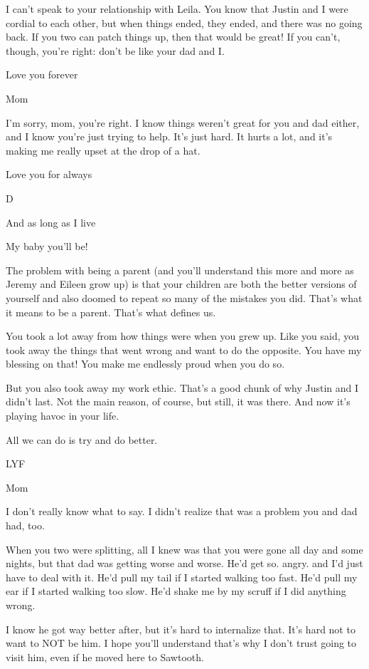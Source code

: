 I can't speak to your relationship with Leila. You know that Justin and I were cordial to each other, but when things ended, they ended, and there was no going back. If you two can patch things up, then that would be great! If you can't, though, you're right: don't be like your dad and I.

Love you forever

Mom

\secdiv{}

I'm sorry, mom, you're right. I know things weren't great for you and dad either, and I know you're just trying to help. It's just hard. It hurts a lot, and it's making me really upset at the drop of a hat.

Love you for always

D

\secdiv{}

And as long as I live

My baby you'll be!

The problem with being a parent (and you'll understand this more and more as Jeremy and Eileen grow up) is that your children are both the better versions of yourself and also doomed to repeat so many of the mistakes you did. That's what it means to be a parent. That's what defines us.

You took a lot away from how things were when you grew up. Like you said, you took away the things that went wrong and want to do the opposite. You have my blessing on that! You make me endlessly proud when you do so.

But you also took away my work ethic. That's a good chunk of why Justin and I didn't last. Not the main reason, of course, but still, it was there. And now it's playing havoc in your life.

All we can do is try and do better.

LYF

Mom

\secdiv{}

I don't really know what to say. I didn't realize that was a problem you and dad had, too.

When you two were splitting, all I knew was that you were gone all day and some nights, but that dad was getting worse and worse. He'd get so. angry. and I'd just have to deal with it. He'd pull my tail if I started walking too fast. He'd pull my ear if I started walking too slow. He'd shake me by my scruff if I did anything wrong.

I know he got way better after, but it's hard to internalize that. It's hard not to want to NOT be him. I hope you'll understand that's why I don't trust going to visit him, even if he moved here to Sawtooth.

